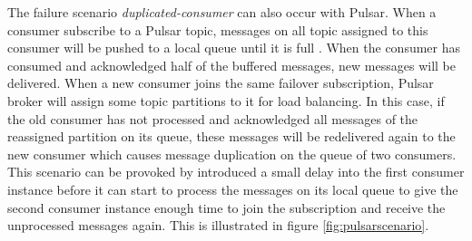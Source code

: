 The failure scenario \emph{duplicated-consumer} can also occur with Pulsar. When a consumer subscribe to a Pulsar topic, messages on all topic assigned to this consumer will be pushed to a local queue until it is full \cite{pulsarbinaryprotocol}. When the consumer has consumed and acknowledged half of the buffered messages, new messages will be delivered. When a new consumer joins the same failover subscription, Pulsar broker will assign some topic partitions to it for load balancing. In this case, if the old consumer has not processed and acknowledged all messages of the reassigned partition on its queue, these messages will be redelivered again to the new consumer which causes message duplication on the queue of two consumers. This scenario can be provoked by introduced a small delay into the first consumer instance before it can start to process the messages on its local queue to give the second consumer instance enough time to join the subscription and receive the unprocessed messages again. This is illustrated in figure \ref{fig:pulsarscenario}.


